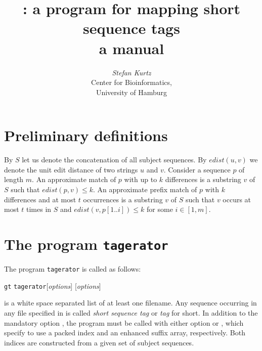 \documentclass[12pt]{article}
\title{\Program: a program for mapping short sequence tags\\
       a manual}
\author{\begin{tabular}{c}
         \textit{Stefan Kurtz}\\
         Center for Bioinformatics,\\
         University of Hamburg
        \end{tabular}}
\newcommand{\Substring}[3]{#1[#2..#3]}
\newcommand{\Program}[0]{\texttt{tagerator}\xspace}
\begin{document}
\maketitle

\section{Preliminary definitions}
By \(S\) let us denote the concatenation of all subject sequences.
By \(edist(u,v)\) we denote the unit edit distance  of two strings
\(u\) and \(v\).
Consider a sequence \(p\) of length \(m\). An approximate match of \(p\) with 
up to \(k\) differences is a substring \(v\) of \(S\) such that 
\(edist(p,v)\leq k\). An approximate prefix match of \(p\) with \(k\) 
differences and at most \(t\) occurrences is a substring \(v\) of \(S\) such 
that \(v\) occurs at most \(t\) times in \(S\) and 
\(edist(v,\Substring{p}{1}{i})\leq k\) for some \(i\in[1,m]\).

\section{The program \Program}

The program \Program is called as follows:
\par
\noindent\texttt{gt} \Program [\textit{options}]   [\textit{options}] 
\par
{} is a white space separated list of at least one
filename. Any sequence occurring in any file specified in
 is called \textit{short sequence tag} or \textit{tag}
for short. In addition to the mandatory option , the program
must be called with either option  or ,
which specify to use a packed index and an enhanced suffix array,
respectively. Both indices are constructed from a given set of subject 
sequences. 
\end{document}
